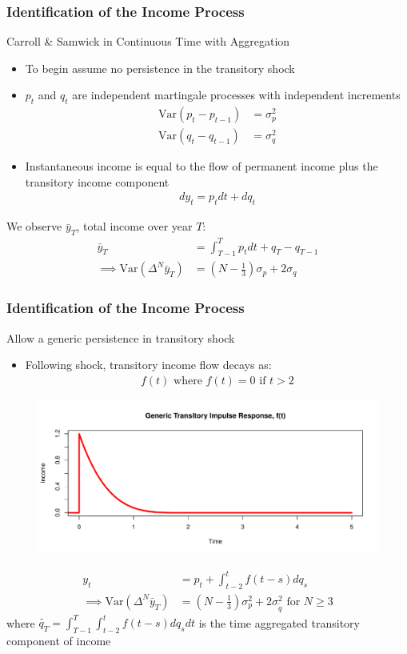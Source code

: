 \documentclass{beamer}
\begin{document}
{
	\frametitle{Identification of the Income Process}
	Carroll \& Samwick in Continuous Time with Aggregation\\
	\begin{itemize}
		\item To begin assume no persistence in the transitory shock
		\item $p_t$ and $q_t$ are independent martingale processes with independent increments
		\begin{align*}
			\mathrm{Var}(p_t-p_{t-1}) &= \sigma^2_p \\
			\mathrm{Var}(q_t-q_{t-1}) &= \sigma^2_q
		\end{align*}
		\item Instantaneous income is equal to the flow of permanent income plus the transitory income component
		\begin{align*}
		dy_t = p_t dt + dq_t
		\end{align*}
	\end{itemize}
	\pause
	We observe $\bar{y}_T$, total income over year $T$:
	\begin{align*}
	\bar{y}_T &= \int_{T-1}^{T}p_t dt + q_T - q_{T-1} \\
	\implies  \mathrm{Var}(\Delta^N \bar{y}_T) &= (N-\frac{1}{3})\sigma_p + 2\sigma_q
	\end{align*}
}
\frame
{
	\frametitle{Identification of the Income Process}
	Allow a generic persistence in transitory shock
	\begin{itemize}
		\item Following shock, transitory income flow decays as:
		\begin{align*}
			f(t)  \text{ where } f(t)=0 \text{ if } t>2
		\end{align*}
	\end{itemize}
	\vspace*{-0.15in}
	\begin{figure}
		\includegraphics[scale=0.3]{../Figures/GenericTransitory.pdf}
	\end{figure}
	\vspace*{-0.15in}
	\begin{align*}
	y_t &= p_t + \int_{t-2}^{t} f(t-s)dq_s\\
	\implies \mathrm{Var}(\Delta^N \bar{y}_T) &= (N-\frac{1}{3})\sigma^2_p +  2 \sigma^2_{\tilde{q}} \text{   for }N \geq 3
	\end{align*}	
	where $	\tilde{q_T} = \int_{T-1}^{T}\int_{t-2}^{t} f(t-s)dq_s dt$ is the time aggregated transitory component of income
}
\end{document}
